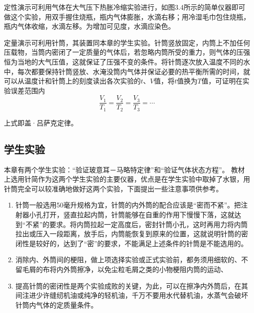 定性演示可利用气体在大气压下热胀冷缩实验进行，如图3.4所示的简单仪器即可做这个实验，用双手握住烧瓶，瓶内气体膨胀，水滴右移；用冷湿毛巾包住烧瓶，瓶内气体收缩，水滴左移。为增加可见度，水滴应染色。
\begin{figure}[htp]
    \centering
    \caption{}
\end{figure}

定量演示可利用针筒，其装置同本章的学生实验。针筒竖放固定，内筒上不加任何压载物，当筒内密闭了一定质量的气体后，若忽略内筒所受的重力，则气体的压强恒为当地的大气压值，这就保证了压强不变的条件。将针筒逐次放入温度不同的水中，每次都要保持针筒竖放、水淹没筒内气体并保证必要的热平衡所需的时间，就可以从温度计和针筒上的刻度读出各次实验的$t$、$V$值，将$t$值换为$T$值，可证明在实验误差范围内
\[\frac{V_1}{T_1}=\frac{V_2}{T_2}=\frac{V_3}{T_3}=\cdots\]

上式即盖·吕萨克定律。

\subsection{学生实验}
本章有两个学生实验：“验证玻意耳－马略特定律”和“验证气体状态方程”。 教材上选用针简作为这两个学生实验的主要仪器，优点是在学生实验中取掉了水银，用针筒完全可以较准确地做好这两个实验，下面提出一些注意事项供参考。

\begin{enumerate}
    \item 针筒一般选用50毫升规格为宜，针筒的内外筒的配合应该是“密而不紧”。把注射器小孔打开，竖直拉起内筒，针筒能够在自重的作用下慢慢下落，这就达到“不紧”的要求。将内筒拉起一定高度后，密封针筒小孔，这时再用力将内筒拉出或压入一段距离，放手后，内筒能恢复到原来的位置，这就说明针筒的密闭性是较好的，达到了“密”的要求，不能满足上述条件的针筒是不能选用的。
\item 消除内、外筒间的梗阻，做上项选择实验或正式实验前，都务须用细软的、不留毛屑的布将内外筒擦净，以免尘粒毛屑之类的小物梗阻内筒的运动、
\item 提高针筒的密闭性是两个实验成败的关键，为此，可以在擦净内外筒后，在其间注进少许缝纫机油或纯净的轻机油，千万不要用水代替机油，水蒸气会破坏针筒内气体的定质量条件。
\end{enumerate}

